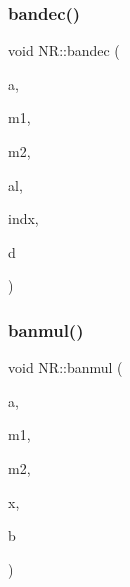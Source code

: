\mbox{\label{namespaceNR_ad98237b2408813153be739eb27223c44}} 
\subsubsection{\texorpdfstring{bandec()}{bandec()}}
{\footnotesize\ttfamily void N\+R\+::bandec (\begin{DoxyParamCaption}\item[{\mbox{\hyperlink{namespaceNR_ad1513aa4697878ed3bff0b8b3c9dd910}{Mat\+\_\+\+I\+O\+\_\+\+DP}} \&}]{a,  }\item[{const int}]{m1,  }\item[{const int}]{m2,  }\item[{\mbox{\hyperlink{namespaceNR_adc1f8da33094b6bbeb1f5f899515ce54}{Mat\+\_\+\+O\+\_\+\+DP}} \&}]{al,  }\item[{\mbox{\hyperlink{namespaceNR_ade2338f6d53b7da3dd6d1c04804541f2}{Vec\+\_\+\+O\+\_\+\+I\+NT}} \&}]{indx,  }\item[{\mbox{\hyperlink{namespaceNR_af6ff762dd605ff477b8e52387253a02a}{DP}} \&}]{d }\end{DoxyParamCaption})}

\mbox{\label{namespaceNR_a6c1a4ae0a3f56dd2d6c3a24d04681fa0}} 
\subsubsection{\texorpdfstring{banmul()}{banmul()}}
{\footnotesize\ttfamily void N\+R\+::banmul (\begin{DoxyParamCaption}\item[{\mbox{\hyperlink{namespaceNR_a2b8abfda8fffad6ba0a1b5a4c0773dbf}{Mat\+\_\+\+I\+\_\+\+DP}} \&}]{a,  }\item[{const int}]{m1,  }\item[{const int}]{m2,  }\item[{\mbox{\hyperlink{namespaceNR_a9f943da53862537c552e2a770cb170ae}{Vec\+\_\+\+I\+\_\+\+DP}} \&}]{x,  }\item[{\mbox{\hyperlink{namespaceNR_a970094d23441f8ef6a45282a7eb2103d}{Vec\+\_\+\+O\+\_\+\+DP}} \&}]{b }\end{DoxyParamCaption})}

\mbox{\label{namespaceNR_a82353f6fd70a72d599d3b4603afd3f43}} 
